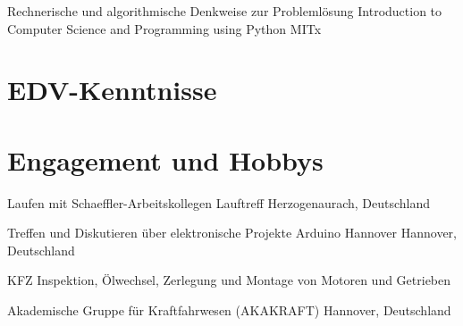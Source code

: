 \documentclass[11pt,a4paper,sans]{moderncv}
\begin{document}
{Rechnerische und algorithmische Denkweise zur Problemlösung}
{Introduction to Computer Science and Programming using Python}
{MITx}
{}
{}



\section{\textbf{EDV-Kenntnisse}}






\section{\textbf{Engagement und Hobbys}}

{
Laufen mit Schaeffler-Arbeitskollegen
}
{Lauftreff}
{Herzogenaurach, Deutschland}
{}
{}

{
Treffen und Diskutieren über elektronische Projekte
}
{Arduino Hannover}
{Hannover, Deutschland}
{}
{}

{
\parbox[t]{12cm}{KFZ Inspektion, Ölwechsel, Zerlegung und Montage von Motoren und Getrieben}
}
{Akademische Gruppe für Kraftfahrwesen (AKAKRAFT)}
{Hannover, Deutschland}
{}
{}
\end{document}
